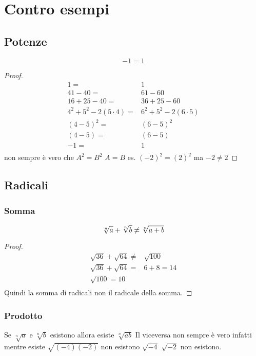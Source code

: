 \chapter{Contro esempi}
\section{Potenze}
\begin{cexmp}
\[-1=1\]
\end{cexmp}
\begin{proof}
		\begin{align*}
	1=&1\\
	41-40=&61-60\\
	16+25-40=&36+25-60\\
	4^2+5^2-2(5\cdot 4)=&6^2+5^2-2(6\cdot 5)\\
	(4-5)^2=&(6-5)^2\\
	(4-5)=&(6-5)\\
	-1=&1\\
	\end{align*}
	non sempre è vero  che $A^2=B^2$ $A=B$ es. $(-2)^2=(2)^2$ ma $-2\neq 2$
\end{proof}

\section{Radicali}
\subsection{Somma}
\begin{cexmp}
	\[\sqrt[n]{a}+\sqrt[n]{b}\neq\sqrt[n]{a+b}\\\]
\end{cexmp}
\begin{proof}
\begin{align*}
\sqrt{36}+\sqrt{64}\neq&\sqrt{100}\\
\sqrt{36}+\sqrt{64}=&6+8=14\\
\sqrt{100}=10\\
\end{align*}
Quindi la somma di radicali non il radicale della somma.
\end{proof}
\subsection{Prodotto}
\begin{cexmp}[Esistenza]
	Se $\sqrt[n]{a}$ e $\sqrt[n]{b}$ esistono allora esiste $\sqrt[n]{ab}$ Il viceversa non sempre è vero infatti mentre esiste $\sqrt{(-4)(-2)}$ non esistono   $\sqrt{-4}$ $\sqrt{-2}$ non esistono.
\end{cexmp}
